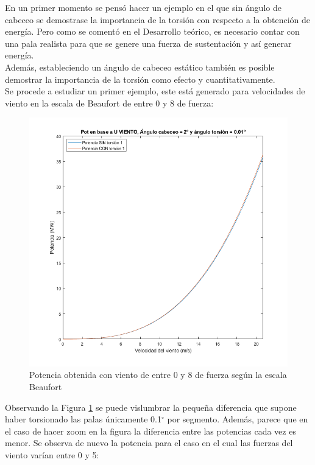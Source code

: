 En un primer momento se pensó hacer un ejemplo en el que sin ángulo de cabeceo se demostrase la importancia de la torsión con respecto a la obtención de energía. Pero como se comentó en el Desarrollo teórico, es necesario contar con una pala realista para que se genere una fuerza de sustentación y así generar energía. \\

Además, estableciendo un ángulo de cabeceo estático también es posible demostrar la importancia de la torsión como efecto y cuantitativamente.\\

Se procede a estudiar un primer ejemplo, este está generado para velocidades de viento en la escala de Beaufort de entre 0 y 8 de fuerza:

\begin{figure}[H]
    \centering
    \includegraphics[width=1\textwidth]{images/0-8beau torsion.png}
    \caption{Potencia obtenida con viento de entre 0 y 8 de fuerza según la escala Beaufort}
     \label{fig:0-8beaufort_torsion_ejemplo_inicial}
\end{figure}

Observando la Figura \ref{fig:0-8beaufort_torsion_ejemplo_inicial} se puede vislumbrar la pequeña diferencia que supone haber torsionado las palas únicamente 0.1$^{\circ}$ por segmento. Además, parece que en el caso de hacer zoom en la figura la diferencia entre las potencias cada vez es menor. Se observa de nuevo la potencia para el caso en el cual las fuerzas del viento varían entre 0 y 5:

